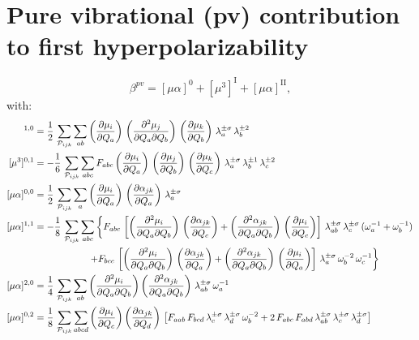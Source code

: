 \documentclass[12pt,a4paper]{article}
\begin{document}
\section{Pure vibrational (pv) contribution to first hyperpolarizability}
\begin{equation}
\beta^{pv} = [\mu\alpha]^0 + [\mu^3]^\text{I} + [\mu\alpha]^\text{II},
\end{equation}
with:
\begin{align}
[\mu^3]^{1,0} &= \frac{1}{2}\,\sum_{\mathcal{P}_{ijk}} \sum_{ab} \tdiff{\mu_i}{Q_a}\,\tdiff{^2\mu_j}{Q_a\partial Q_b}\,\tdiff{\mu_k}{Q_b}\,\lb{\sigma}{a}\,\lb{2}{b}\\
[\mu^3]^{0,1} &= -\frac{1}{6}\,\sum_{\mathcal{P}_{ijk}} \sum_{abc} F_{abc} \tdiff{\mu_i}{Q_a}\,\tdiff{\mu_j}{Q_b}\,\tdiff{\mu_k}{Q_c}\,\lb{\sigma}{a}\,\lb{1}{b}\,\lb{2}{c}\\
%
[\mu\alpha]^{0,0} &= \frac{1}{2}\,\sum_{\mathcal{P}_{ijk}} \sum_a \tdiff{\mu_i}{Q_a}\,\tdiff{\alpha_{jk}}{Q_a}\,\lb{\sigma}{a}\\
[\mu\alpha]^{1,1} &= -\frac{1}{8}\,\sum_{\mathcal{P}_{ijk}} \sum_{abc}\left\{ F_{abc}\,\left[\tdiff{^2\mu_i}{Q_a\partial Q_b}\,\tdiff{\alpha_{jk}}{Q_c}+\tdiff{^2\alpha_{jk}}{Q_a\partial Q_b}\,\tdiff{\mu_i}{Q_c}\right]\,\lb{\sigma}{ab}\,\lb{\sigma}{c}\,(\omega_a^{-1}+\omega_b^{-1})\right.\nonumber\\
&\hspace{2cm}\left.+ F_{bcc}\,\left[\tdiff{^2\mu_i}{Q_a\partial Q_b}\,\tdiff{\alpha_{jk}}{Q_a}+\tdiff{^2\alpha_{jk}}{Q_a\partial Q_b}\,\tdiff{\mu_i}{Q_a}\right]\,\lb{\sigma}{a}\,\omega_b^{-2}\,\omega_c^{-1}\right\}\\
[\mu\alpha]^{2,0} &= \frac{1}{4}\,\sum_{\mathcal{P}_{ijk}} \sum_{ab} \tdiff{^2\mu_i}{Q_a\partial Q_b}\tdiff{^2\alpha_{jk}}{Q_a\partial Q_b}\,\lb{\sigma}{ab}\,\omega_a^{-1}\\
[\mu\alpha]^{0,2} &= \frac{1}{8}\,\sum_{\mathcal{P}_{ijk}} \sum_{abcd}\tdiff{\mu_i}{Q_c}\tdiff{\alpha_{jk}}{Q_d}\,\left[ F_{aab}\,F_{bcd}\,\lb{\sigma}{c}\,\lb{\sigma}{d}\,\omega_b^{-2}+2\,F_{abc}\,F_{abd}\,\lb{\sigma}{ab}\,\lb{\sigma}{c}\,\lb{\sigma}{d}\right]
\end{align}
\end{document}
